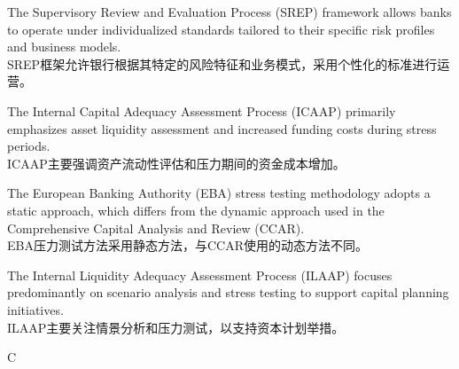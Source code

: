 \documentclass{article}
\begin{document}
\begin{choices}
    \item The Supervisory Review and Evaluation Process (SREP) framework allows banks to operate under individualized standards tailored to their specific risk profiles and business models. \\
    SREP框架允许银行根据其特定的风险特征和业务模式，采用个性化的标准进行运营。
    
    \item The Internal Capital Adequacy Assessment Process (ICAAP) primarily emphasizes asset liquidity assessment and increased funding costs during stress periods. \\
    ICAAP主要强调资产流动性评估和压力期间的资金成本增加。
    
    \item The European Banking Authority (EBA) stress testing methodology adopts a static approach, which differs from the dynamic approach used in the Comprehensive Capital Analysis and Review (CCAR). \\
    EBA压力测试方法采用静态方法，与CCAR使用的动态方法不同。
    
    \item The Internal Liquidity Adequacy Assessment Process (ILAAP) focuses predominantly on scenario analysis and stress testing to support capital planning initiatives. \\
    ILAAP主要关注情景分析和压力测试，以支持资本计划举措。
\end{choices}

\begin{correctanswer}
    C
\end{correctanswer}
\end{document}
